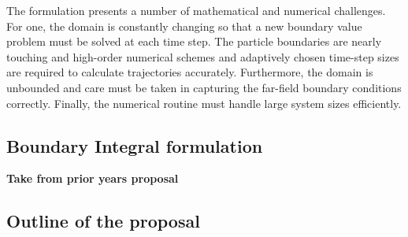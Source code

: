 
The formulation presents a number of mathematical and numerical
challenges. For one, the domain is constantly changing so that a new
boundary value problem must be solved at each time step. The particle
boundaries are nearly touching and high-order numerical
schemes and adaptively chosen time-step sizes
are required to calculate trajectories accurately.
Furthermore, the domain is unbounded and care must be taken 
in capturing the far-field boundary conditions correctly. 
Finally, the numerical routine must handle large system sizes
efficiently.


\subsection{Boundary Integral formulation}
\textbf{Take from prior years proposal}


\subsection{Outline of the proposal}
